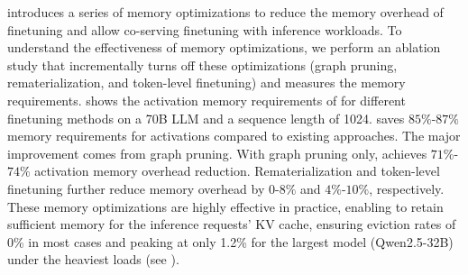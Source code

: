 \sys introduces a series of memory optimizations to reduce the memory overhead of \peft finetuning and allow co-serving finetuning with inference workloads.
%
To understand the effectiveness of \sys memory optimizations, we perform an ablation study that incrementally turns off these optimizations (graph pruning, rematerialization, and token-level finetuning) and measures the memory requirements. 
%
 shows the activation memory requirements of \sys for different finetuning methods on a 70B LLM and a sequence length of 1024. \sys saves $85\%$-$87\%$ memory requirements for activations compared to existing approaches. The major improvement comes from graph pruning. With graph pruning only, \sys achieves $71\%$-$74\%$ activation memory overhead reduction. Rematerialization and token-level finetuning further reduce memory overhead by $0$-$8\%$ and $4\%$-$10\%$, respectively. These memory optimizations are highly effective in practice, enabling \sys to retain sufficient memory for the inference requests' KV cache, ensuring eviction rates of 0\% in most cases and peaking at only 1.2\% for the largest model (Qwen2.5-32B) under the heaviest loads (see ).

